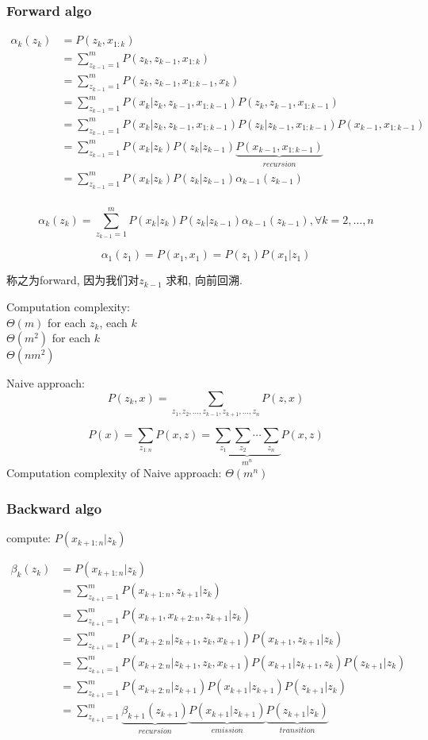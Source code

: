 \documentclass{article}
\begin{document}
\subsubsection{Forward algo}
$$
\begin{aligned}
\alpha_k(z_k)
& = P(z_k, x_{1:k}) \\ 
& = \sum_{z_{k-1} = 1}^m P(z_k, z_{k-1}, x_{1:k}) \\ 
& = \sum_{z_{k-1} = 1}^m P(z_k, z_{k-1}, x_{1:k-1}, x_k) \\ 
& = \sum_{z_{k-1} = 1}^m P(x_k|z_k, z_{k-1}, x_{1:k-1}) P(z_k, z_{k-1}, x_{1:k-1}) \\ 
& = \sum_{z_{k-1} = 1}^m P(x_k|z_k, z_{k-1}, x_{1:k-1}) P(z_k| z_{k-1}, x_{1:k-1}) P(x_{k-1}, x_{1:k-1}) \\ 
& = \sum_{z_{k-1} = 1}^m P(x_k|z_k) P(z_k| z_{k-1}) \underbrace{P(x_{k-1}, x_{1:k-1})}_{recursion} \\ 
& = \sum_{z_{k-1} = 1}^m P(x_k|z_k) P(z_k| z_{k-1}) \alpha_{k-1}(z_{k-1}) \\ 
\end{aligned}
$$

$$ \alpha_k(z_k) = \sum_{z_{k-1} = 1}^m P(x_k|z_k) P(z_k| z_{k-1}) \alpha_{k-1}(z_{k-1}), \forall k=2,\ldots, n $$

$$\alpha_1(z_1) = P(x_1, x_1) = P(z_1) P(x_1|z_1)$$

称之为forward, 因为我们对$z_{k-1}$ 求和, 向前回溯.

Computation complexity:\\
$\Theta(m)$ for each $z_k$, each $k$ \\
$\Theta(m^2)$ for each $k$ \\
$\Theta(n m^2)$

Naive approach:
$$ P(z_k,x) = \sum_{z_1, z_2, \ldots, z_{k-1}, z_{k+1}, \ldots, z_n} P(z, x)$$

$$ 
P(x) 
= \sum_{z_{1:n}} P(x,z) 
= \underbrace{\sum_{z_1} \sum_{z_2} \cdots \sum_{z_n}}_{m^n} P(x,z) 
$$
Computation complexity of Naive approach: $\Theta(m^n)$

\subsubsection{Backward algo}
compute: $P(x_{k+1:n}|z_k)$

$$
\begin{aligned}
\beta_k(z_k)
& = P(x_{k+1:n}|z_k) \\
& = \sum_{z_{k+1} = 1}^m P(x_{k+1:n}, z_{k+1}|z_k) \\
& = \sum_{z_{k+1} = 1}^m P(x_{k+1}, x_{k+2:n}, z_{k+1}|z_k) \\
& = \sum_{z_{k+1} = 1}^m P(x_{k+2:n}|z_{k+1}, z_k, x_{k+1}) P(x_{k+1}, z_{k+1}| z_k) \\
& = \sum_{z_{k+1} = 1}^m P(x_{k+2:n}|z_{k+1}, z_k, x_{k+1}) P(x_{k+1}| z_{k+1}, z_k) P(z_{k+1}|z_k) \\
& = \sum_{z_{k+1} = 1}^m P(x_{k+2:n}|z_{k+1}) P(x_{k+1}| z_{k+1}) P(z_{k+1}|z_k) \\
& = \sum_{z_{k+1} = 1}^m \underbrace{\beta_{k+1}(z_{k+1})}_{recursion} \underbrace{P(x_{k+1}| z_{k+1})}_{emission} \underbrace{P(z_{k+1}|z_k)}_{transition} \\
\end{aligned}
$$
\end{document}
